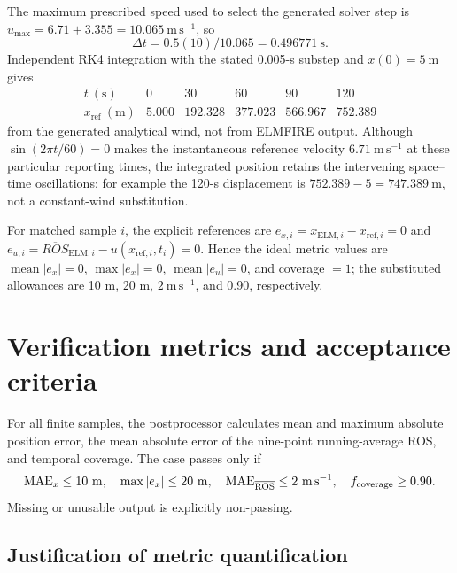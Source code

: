 The maximum prescribed speed used to select the generated solver step is
\(u_{\max}=6.71+3.355=10.065~\mathrm{m\,s^{-1}}\), so
\[
 \Delta t=0.5(10)/10.065=0.496771~\mathrm{s}.
\]
Independent RK4 integration with the stated 0.005-s substep and
\(x(0)=5~\mathrm{m}\) gives
\[
\begin{array}{c|rrrrr}
t~(\mathrm{s})&0&30&60&90&120\\\hline
x_{\mathrm{ref}}~(\mathrm{m})&
5.000&192.328&377.023&566.967&752.389
\end{array}
\]
from the generated analytical wind, not from ELMFIRE output.  Although
\(\sin(2\pi t/60)=0\) makes the instantaneous reference velocity
\(6.71~\mathrm{m\,s^{-1}}\) at these particular reporting times, the
integrated position retains the intervening space--time oscillations; for
example the 120-s displacement is \(752.389-5=747.389~\mathrm{m}\), not a
constant-wind substitution.

For matched sample \(i\), the explicit references are
\(e_{x,i}=x_{\mathrm{ELM},i}-x_{\mathrm{ref},i}=0\) and
\(e_{u,i}=\overline{ROS}_{\mathrm{ELM},i}
-u(x_{\mathrm{ref},i},t_i)=0\).  Hence the ideal metric values are
\(\operatorname{mean}|e_x|=0\), \(\max|e_x|=0\),
\(\operatorname{mean}|e_u|=0\), and coverage \(=1\); the substituted
allowances are 10 m, 20 m, \(2~\mathrm{m\,s^{-1}}\), and 0.90,
respectively.

\section{Verification metrics and acceptance criteria}
For all finite samples, the postprocessor calculates mean and maximum absolute
position error, the mean absolute error of the nine-point running-average ROS,
and temporal coverage. The case passes only if
\[
 {\rm MAE}_x\le10~{\rm m},\quad
 \max|e_x|\le20~{\rm m},\quad
 {\rm MAE}_{\overline{\rm ROS}}\le2~{\rm m\,s^{-1}},\quad
 f_{\rm coverage}\ge0.90 .
\]
Missing or unusable output is explicitly non-passing.

\subsection{Justification of metric quantification}

